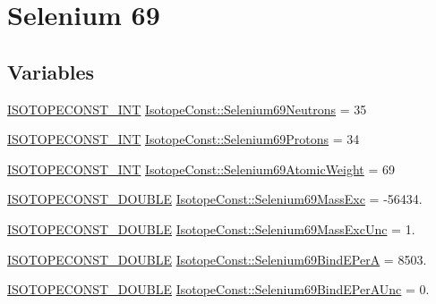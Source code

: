 \hypertarget{group___isotope_const-_selenium-_se69}{}\section{Selenium 69}
\label{group___isotope_const-_selenium-_se69}
\subsection*{Variables}
\begin{DoxyCompactItemize}
\item 
\mbox{\hyperlink{group___isotope_const-_macros_ga5f18360b3e99483a35c32d789e62621c}{I\+S\+O\+T\+O\+P\+E\+C\+O\+N\+S\+T\+\_\+\+I\+NT}} \mbox{\hyperlink{group___isotope_const-_selenium-_se69_ga6ad7b8fd2483f7d843d70d641b89c21a}{Isotope\+Const\+::\+Selenium69\+Neutrons}} = 35
\item 
\mbox{\hyperlink{group___isotope_const-_macros_ga5f18360b3e99483a35c32d789e62621c}{I\+S\+O\+T\+O\+P\+E\+C\+O\+N\+S\+T\+\_\+\+I\+NT}} \mbox{\hyperlink{group___isotope_const-_selenium-_se69_gae502ab3bc5322b2de57cbd1618a9e769}{Isotope\+Const\+::\+Selenium69\+Protons}} = 34
\item 
\mbox{\hyperlink{group___isotope_const-_macros_ga5f18360b3e99483a35c32d789e62621c}{I\+S\+O\+T\+O\+P\+E\+C\+O\+N\+S\+T\+\_\+\+I\+NT}} \mbox{\hyperlink{group___isotope_const-_selenium-_se69_ga9c04b076b2b3d35232d0e342ff567fca}{Isotope\+Const\+::\+Selenium69\+Atomic\+Weight}} = 69
\item 
\mbox{\hyperlink{group___isotope_const-_macros_ga8f45a7272ce02c0b4c65c44636ed719a}{I\+S\+O\+T\+O\+P\+E\+C\+O\+N\+S\+T\+\_\+\+D\+O\+U\+B\+LE}} \mbox{\hyperlink{group___isotope_const-_selenium-_se69_ga1d0c1d2368173494b11bf83bf90c67e4}{Isotope\+Const\+::\+Selenium69\+Mass\+Exc}} = -\/56434.
\item 
\mbox{\hyperlink{group___isotope_const-_macros_ga8f45a7272ce02c0b4c65c44636ed719a}{I\+S\+O\+T\+O\+P\+E\+C\+O\+N\+S\+T\+\_\+\+D\+O\+U\+B\+LE}} \mbox{\hyperlink{group___isotope_const-_selenium-_se69_gaf4c2e2ccee1c709d78928f8542347fe8}{Isotope\+Const\+::\+Selenium69\+Mass\+Exc\+Unc}} = 1.
\item 
\mbox{\hyperlink{group___isotope_const-_macros_ga8f45a7272ce02c0b4c65c44636ed719a}{I\+S\+O\+T\+O\+P\+E\+C\+O\+N\+S\+T\+\_\+\+D\+O\+U\+B\+LE}} \mbox{\hyperlink{group___isotope_const-_selenium-_se69_ga9e201c76a91f9d168fda5941dd324107}{Isotope\+Const\+::\+Selenium69\+Bind\+E\+PerA}} = 8503.
\item 
\mbox{\hyperlink{group___isotope_const-_macros_ga8f45a7272ce02c0b4c65c44636ed719a}{I\+S\+O\+T\+O\+P\+E\+C\+O\+N\+S\+T\+\_\+\+D\+O\+U\+B\+LE}} \mbox{\hyperlink{group___isotope_const-_selenium-_se69_gadeefaf12969ccc8bba097f62fa41db48}{Isotope\+Const\+::\+Selenium69\+Bind\+E\+Per\+A\+Unc}} = 0.

\end{DoxyCompactItemize}
